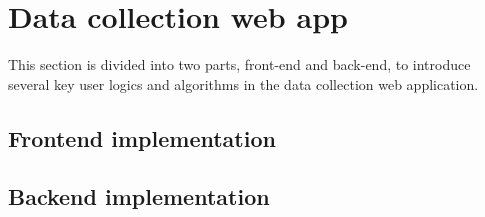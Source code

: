 \section{Data collection web app}
\label{sec:Data collection web app}
This section is divided into two parts, front-end and back-end, to introduce several key user logics and algorithms in the data collection web application.

\subsection{Frontend implementation} %


\subsection{Backend implementation} %
